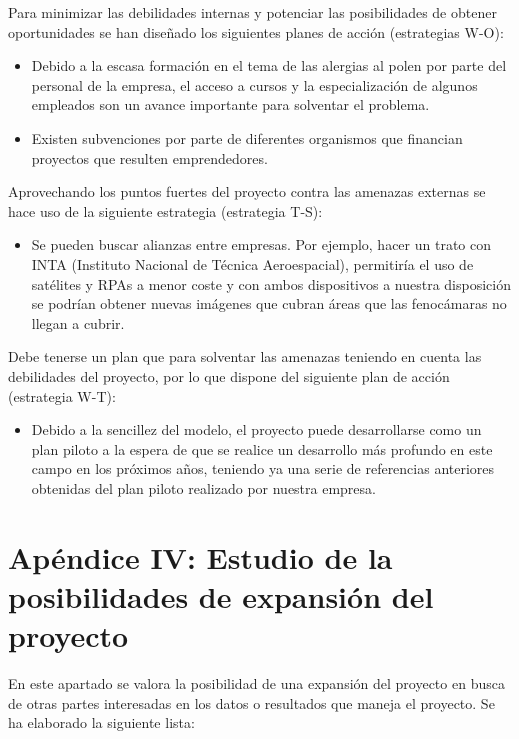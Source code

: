 \documentclass[12pt,oneside,a4paper]{article}
\numberwithin{figure}{section}
\begin{document}
Para minimizar las debilidades internas y potenciar las posibilidades de obtener oportunidades se han diseñado los siguientes planes de acción (estrategias W-O):

\begin{itemize}

\item Debido a la escasa formación en el tema de las alergias al polen por parte del personal de la empresa, el acceso a cursos y la especialización de algunos empleados son un avance importante para solventar el problema.
\item Existen subvenciones por parte de diferentes organismos que financian proyectos que resulten emprendedores.
\end{itemize} 

Aprovechando los puntos fuertes del proyecto contra las amenazas externas se hace uso de la siguiente estrategia (estrategia T-S):

\begin{itemize}
\item Se pueden buscar alianzas entre empresas. Por ejemplo, hacer un trato con INTA (Instituto Nacional de Técnica Aeroespacial), permitiría el uso de satélites y RPAs a menor coste y con ambos dispositivos a nuestra disposición se podrían obtener nuevas imágenes que cubran áreas que las fenocámaras no llegan a cubrir.
\end{itemize}

Debe tenerse un plan que para solventar las amenazas teniendo en cuenta las debilidades del proyecto, por lo que dispone del siguiente plan de acción (estrategia W-T):

\begin{itemize}
\item Debido a la sencillez del modelo, el proyecto puede desarrollarse como un plan piloto a la espera de que se realice un desarrollo más profundo en este campo en los próximos años, teniendo ya una serie de referencias anteriores obtenidas del plan piloto realizado por nuestra empresa.
\end{itemize}



\section{Apéndice IV: Estudio de la posibilidades de expansión del proyecto}

En este apartado se valora la posibilidad de una expansión del proyecto en busca de otras partes interesadas en los datos o resultados que maneja el proyecto. Se ha elaborado la siguiente lista:
\end{document}
